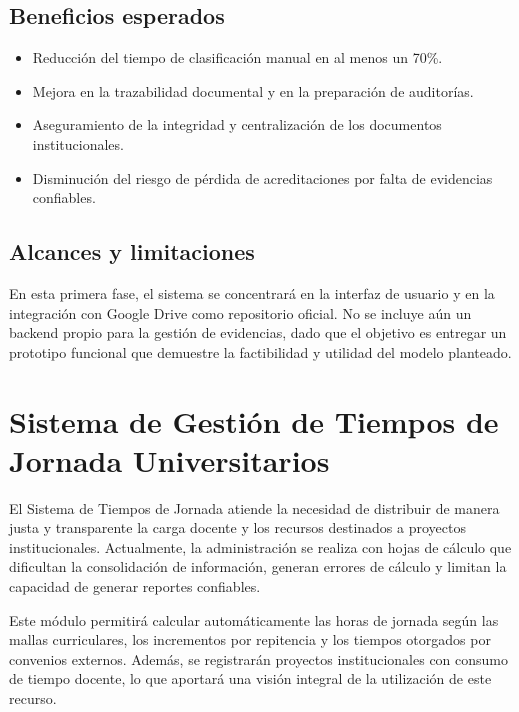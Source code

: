 \subsection*{Beneficios esperados}
\begin{itemize}
  \item Reducción del tiempo de clasificación manual en al menos un 70\%.
  \item Mejora en la trazabilidad documental y en la preparación de auditorías.
  \item Aseguramiento de la integridad y centralización de los documentos institucionales.
  \item Disminución del riesgo de pérdida de acreditaciones por falta de evidencias confiables.
\end{itemize}

\subsection*{Alcances y limitaciones}
En esta primera fase, el sistema se concentrará en la interfaz de usuario y en la integración con Google Drive como repositorio oficial. No se incluye aún un backend propio para la gestión de evidencias, dado que el objetivo es entregar un prototipo funcional que demuestre la factibilidad y utilidad del modelo planteado.

\section*{Sistema de Gestión de Tiempos de Jornada Universitarios}

El Sistema de Tiempos de Jornada atiende la necesidad de distribuir de manera justa y transparente la carga docente y los recursos destinados a proyectos institucionales. Actualmente, la administración se realiza con hojas de cálculo que dificultan la consolidación de información, generan errores de cálculo y limitan la capacidad de generar reportes confiables.

Este módulo permitirá calcular automáticamente las horas de jornada según las mallas curriculares, los incrementos por repitencia y los tiempos otorgados por convenios externos. Además, se registrarán proyectos institucionales con consumo de tiempo docente, lo que aportará una visión integral de la utilización de este recurso.

